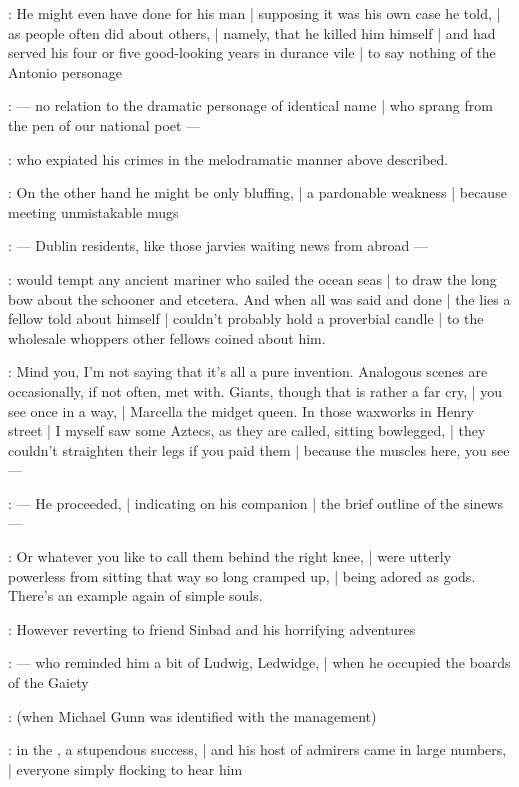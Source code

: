 :
He might even have done for his man |
supposing it was his own case he told, |
as people often did about others, |
namely, that he killed him himself |
and had served his four or five good-looking years in durance vile |
to say nothing of the Antonio personage

:
    --- no relation to the dramatic personage of identical name |
        who sprang from the pen of our national poet ---

:
who expiated his crimes in the melodramatic manner above described.

:
On the other hand he might be only bluffing, |
a pardonable weakness |
because meeting unmistakable mugs

:
    --- Dublin residents, like those jarvies waiting news from abroad ---

:
would tempt any ancient mariner who sailed the ocean seas |
to draw the long bow about the schooner  and etcetera.
And when all was said and done |
the lies a fellow told about himself |
couldn't probably hold a proverbial candle |
to the wholesale whoppers other fellows coined about him.

\Bloom:
Mind you, I'm not saying that it's all a pure invention.
Analogous scenes are occasionally, if not often, met with.
Giants, though that is rather a far cry, |
you see once in a way, |
Marcella the midget queen.
In those waxworks in Henry street |
I myself saw some Aztecs, as they are called, sitting bowlegged, |
they couldn't straighten their legs if you paid them |
because the muscles here, you see---

:
    --- He proceeded, |
        indicating on his companion |
        the brief outline of the sinews ---

\Bloom:
Or whatever you like to call them behind the right knee, |
were utterly powerless from sitting that way so long cramped up, |
being adored as gods.
There's an example again of simple souls.

:
However reverting to friend Sinbad and his horrifying adventures

:
    --- who reminded him a bit of Ludwig,  Ledwidge, |
        when he occupied the boards of the Gaiety

        :
            (when Michael Gunn was identified with the management)

:
        in the , a stupendous success, |
        and his host of admirers came in large numbers, |
        everyone simply flocking to hear him

